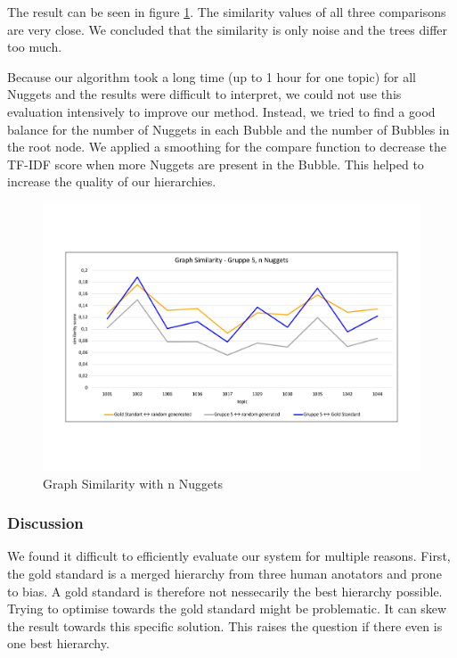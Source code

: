 The result can be seen in figure \ref{fig:graphn}. The similarity values of all three comparisons are very close. We concluded that the similarity is only noise and the trees differ too much.

Because our algorithm took a long time (up to 1 hour for one topic) for all Nuggets and the results were difficult to interpret, we could not use this evaluation intensively to improve our method. Instead, we tried to find a good balance for the number of Nuggets in each Bubble and the number of Bubbles in the root node. We applied a smoothing for the compare function to decrease the TF-IDF score when more Nuggets are present in the Bubble. This helped to increase the quality of our hierarchies.

\begin{figure}[H]
	\centering
	\includegraphics[trim= 0 130 0 130,width=\textwidth]{img/sim_v2.pdf}
	\caption{Graph Similarity with n Nuggets}
	\label{fig:graphn}
\end{figure}

\subsubsection{Discussion}

We found it difficult to efficiently evaluate our system for multiple reasons. First, the gold standard is a merged hierarchy from three human anotators and prone to bias. A gold standard is therefore not nessecarily the best hierarchy possible. Trying to optimise towards the gold standard might be problematic. It can skew the result towards this specific solution. This raises the question if there even is one best hierarchy.

